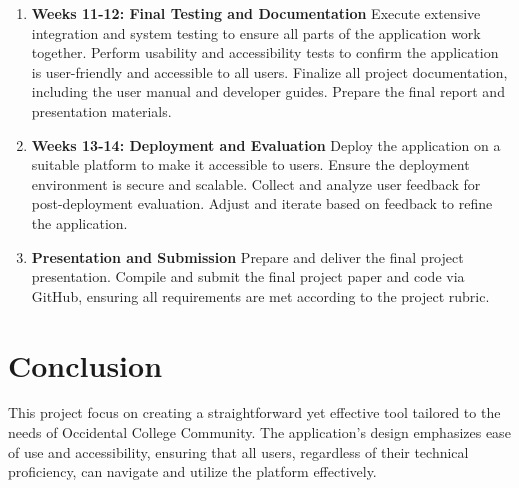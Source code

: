 \documentclass[10pt,twocolumn]{article}
\begin{document}
\begin{enumerate}
        \item \textbf{Weeks 11-12: Final Testing and Documentation} Execute extensive integration and system testing to ensure all parts of the application work together. Perform usability and accessibility tests to confirm the application is user-friendly and accessible to all users. Finalize all project documentation, including the user manual and developer guides. Prepare the final report and presentation materials.

        \item \textbf{Weeks 13-14: Deployment and Evaluation} Deploy the application on a suitable platform to make it accessible to users. Ensure the deployment environment is secure and scalable. Collect and analyze user feedback for post-deployment evaluation. Adjust and iterate based on feedback to refine the application.

        \item \textbf{Presentation and Submission} Prepare and deliver the final project presentation. Compile and submit the final project paper and code via GitHub, ensuring all requirements are met according to the project rubric.


    \end{enumerate}

    \section{Conclusion}
    This project focus on creating a straightforward yet effective tool tailored to the needs of Occidental College Community. The application's design emphasizes ease of use and accessibility, ensuring that all users, regardless of their technical proficiency, can navigate and utilize the platform effectively.







    
\end{document}
